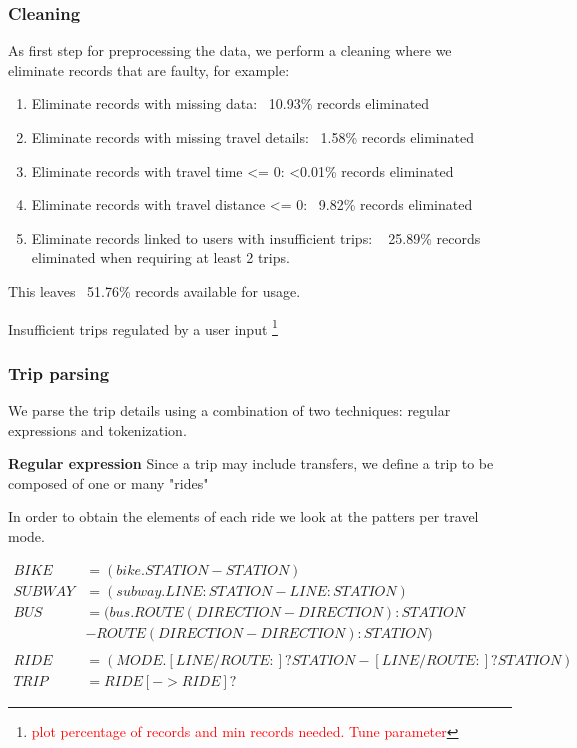 \documentclass{article}
\newcommand{\selfnote}[1]{\footnote{\textcolor{red}{#1}}}
\begin{document}
\subsubsection{Cleaning}
As first step for preprocessing the data, we perform a cleaning where we eliminate records that are faulty, for example: 

\begin{enumerate}
\item Eliminate records with missing data: ~10.93\% records eliminated
\item Eliminate records with missing travel details: ~1.58\% records eliminated
\item Eliminate records with travel time <= 0: <0.01\% records eliminated
\item Eliminate records with travel distance <= 0: ~9.82\% records eliminated
\item Eliminate records linked to users with insufficient trips: ~ 25.89\% records eliminated when requiring at least 2 trips.
\end{enumerate}

This leaves ~51.76\% records available for usage. 

Insufficient trips regulated by a user input \selfnote{plot percentage of records and min records needed. Tune parameter}

\subsubsection{Trip parsing} 
\label{sec:tripParsing}
We parse the trip details using a combination of two techniques: regular expressions and tokenization. 

\textbf{Regular expression}
Since a trip may include transfers, we define a trip to be composed of one or many "rides"

In order to obtain the elements of each ride we look at the patters per travel mode.

    \begin{align*}
    BIKE &= (bike.STATION-STATION) \\
    SUBWAY &= (subway.LINE:STATION-LINE:STATION) \\
    BUS &= (bus.ROUTE(DIRECTION-DIRECTION):STATION \\
    &-ROUTE(DIRECTION-DIRECTION):STATION) \\ \\
    RIDE &= (MODE.[LINE/ROUTE:]?STATION-[LINE/ROUTE:]?STATION) \\
    TRIP &= RIDE [-> RIDE]? 
	\end{align*}    
\end{document}
